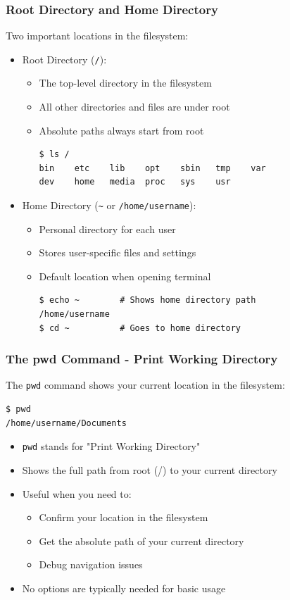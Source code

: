 \documentclass[10pt]{beamer}
\begin{document}
\begin{frame}[fragile]
    \frametitle{Root Directory and Home Directory}
    Two important locations in the filesystem:
    \begin{itemize}
        \item Root Directory (\texttt{/}):
        \begin{itemize}
            \item The top-level directory in the filesystem
            \item All other directories and files are under root
            \item Absolute paths always start from root
\begin{verbatim}
$ ls /
bin    etc    lib    opt    sbin   tmp    var
dev    home   media  proc   sys    usr
\end{verbatim}
        \end{itemize}
        \item Home Directory (\texttt{\textasciitilde} or \texttt{/home/username}):
        \begin{itemize}
            \item Personal directory for each user
            \item Stores user-specific files and settings
            \item Default location when opening terminal
\begin{verbatim}
$ echo ~        # Shows home directory path
/home/username
$ cd ~          # Goes to home directory
\end{verbatim}
        \end{itemize}
    \end{itemize}
\end{frame}


\begin{frame}[fragile]
    \frametitle{The pwd Command - Print Working Directory}
    The \texttt{pwd} command shows your current location in the filesystem:
\begin{verbatim}
$ pwd
/home/username/Documents
\end{verbatim}
    \begin{itemize}
        \item \texttt{pwd} stands for "Print Working Directory"
        \item Shows the full path from root (/) to your current directory
        \item Useful when you need to:
        \begin{itemize}
            \item Confirm your location in the filesystem
            \item Get the absolute path of your current directory
            \item Debug navigation issues
        \end{itemize}
        \item No options are typically needed for basic usage
    \end{itemize}
\end{frame}
\end{document}
